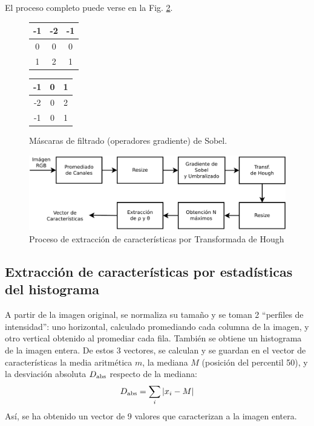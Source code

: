 \documentclass[conference,a4paper,10pt,oneside,final]{tfmpd}
\begin{document}
El proceso completo puede verse en la Fig. \ref{procesohough}.
\begin{figure}
\begin{center}
\begin{tabular}{|c|c|c|}
\hline -1 & -2 & -1 \\\hline 0 & 0 & 0 \\\hline 1 & 2 & 1 \\\hline
\end{tabular}
\begin{tabular}{|c|c|c|}
\hline -1 & 0 & 1 \\\hline -2 & 0 & 2 \\\hline -1 & 0 & 1 \\\hline
\end{tabular}
\end{center}
\caption{Máscaras de filtrado (operadores gradiente) de Sobel.}
\label{masksobel}
\end{figure}
\begin{figure}
\begin{center}
\includegraphics[scale=0.25]{../diagramas/procesohough} 
\end{center}
\caption{Proceso de extracción de características por Transformada de Hough}
\label{procesohough}
\end{figure}
%
%
\subsection{Extracción de características por estadísticas del histograma}
A partir de la imagen original, se normaliza su tamaño y se toman 2 ``perfiles
de intensidad'': uno horizontal, calculado promediando
cada columna de la
imagen, y otro vertical obtenido al promediar cada fila. También se obtiene un
histograma de la imagen entera. De estos 3 vectores, se calculan
y se guardan en el
vector de características la media aritmética $m$, la mediana $M$ (posición del
percentil 50),  y la desviación absoluta $D_{\textrm{abs}}$ respecto de la mediana:
\begin{equation*}
D_{\textrm{abs}}=\sum_i |x_i - M|
\end{equation*}
Así, se ha obtenido un vector de 9 valores que caracterizan %
a la imagen entera.
\end{document}

